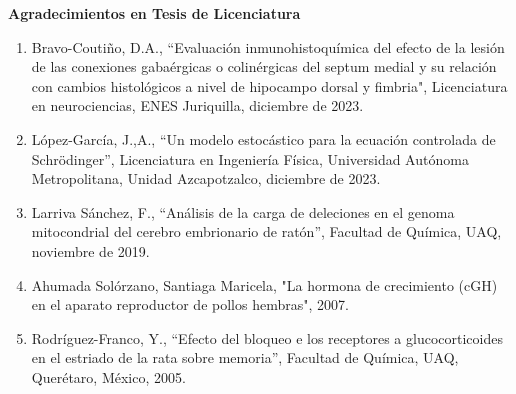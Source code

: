 \textbf{Agradecimientos en Tesis de Licenciatura}

\begin{enumerate}

\item Bravo-Coutiño, D.A., “Evaluación inmunohistoquímica del efecto de la lesión de las conexiones gabaérgicas o 
colinérgicas 
del septum medial y su relación con cambios histológicos a nivel de hipocampo dorsal y fimbria", Licenciatura en 
neurociencias, ENES Juriquilla, diciembre de 2023.

\item López-García, J.,A., “Un modelo estocástico para la ecuación controlada de Schrödinger”, Licenciatura en Ingeniería 
Física, Universidad Autónoma Metropolitana, Unidad Azcapotzalco, diciembre de 2023.

\item Larriva Sánchez, F., “Análisis de la carga de deleciones en el genoma mitocondrial del cerebro embrionario de ratón”, 
Facultad de Química, UAQ, noviembre de 2019.

\item Ahumada Solórzano, Santiaga Maricela, "La hormona de crecimiento (cGH) en el aparato reproductor de pollos hembras", 
2007.

\item Rodríguez-Franco, Y., “Efecto del bloqueo e los receptores a glucocorticoides en el estriado de la rata sobre 
memoria”, 
Facultad de Química, UAQ, Querétaro, México, 2005.

\end{enumerate}

